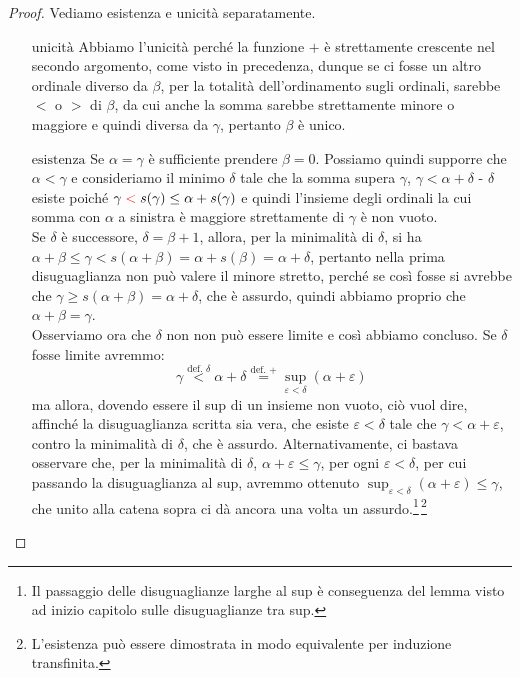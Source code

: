 \begin{proof}
	Vediamo esistenza e unicità separatamente.
	\begin{itemize}
		\item[$\boxed{\text{unicità}}$] Abbiamo l'unicità perché la funzione $+$ è strettamente crescente nel secondo argomento, come visto in precedenza, dunque se ci fosse un altro ordinale diverso da $\beta$, per la totalità dell'ordinamento sugli
		ordinali, sarebbe $<$ o $>$ di $\beta$, da cui anche la somma sarebbe strettamente minore o maggiore e quindi diversa da $\gamma$, pertanto $\beta$ è unico.
		\item[$\boxed{\text{esistenza}}$] Se $\alpha = \gamma$ è sufficiente prendere $\beta = 0$. Possiamo quindi supporre che $\alpha < \gamma$ e consideriamo
		il minimo $\delta$ tale che la somma supera $\gamma$, $\gamma < \alpha + \delta$ - $\delta$ esiste poiché $\gamma \;\textcolor{red}{<}\; s(\gamma) \leq \alpha + s(\gamma)$ e quindi l'insieme degli ordinali la cui somma con $\alpha$ a sinistra è maggiore strettamente di $\gamma$ è non vuoto.\\
		Se $\delta$ è successore, $\delta = \beta + 1$, allora, per la minimalità di $\delta$, si ha $\alpha + \beta \leq \gamma < s(\alpha + \beta) = \alpha + s(\beta) = \alpha + \delta$, pertanto nella prima disuguaglianza non può valere il minore stretto, perché se così fosse si avrebbe che $\gamma \geq s(\alpha + \beta) = \alpha + \delta$, che è assurdo, 
		quindi abbiamo proprio che $\alpha + \beta = \gamma$.\\
		Osserviamo ora che $\delta$ non non può essere limite e così abbiamo concluso. Se $\delta$ fosse limite avremmo:
		\[ \gamma \overset{\text{def. $\delta$}}{<} \alpha + \delta \overset{\text{def. +}}{=} \sup_{\varepsilon < \delta}(\alpha + \varepsilon)
			\] 
		ma allora, dovendo essere il sup di un insieme non vuoto, ciò vuol dire, affinché la disuguaglianza scritta sia vera, che esiste $\varepsilon < \delta$ tale che $\gamma < \alpha + \varepsilon$, contro la minimalità di $\delta$, che è assurdo. Alternativamente,
		ci bastava osservare che, per la minimalità di $\delta$, $\alpha + \varepsilon \leq \gamma$, per ogni $\varepsilon < \delta$, per cui passando la disuguaglianza al sup, avremmo ottenuto $\sup_{\varepsilon < \delta}(\alpha + \varepsilon) \leq \gamma$, che unito alla catena sopra ci dà ancora una volta un assurdo.\footnote{Il passaggio delle disuguaglianze larghe al sup è conseguenza del lemma visto ad inizio capitolo sulle disuguaglianze tra sup.}\,\footnote{L'esistenza può essere dimostrata in modo equivalente per induzione transfinita.}
	\end{itemize}
\end{proof}

